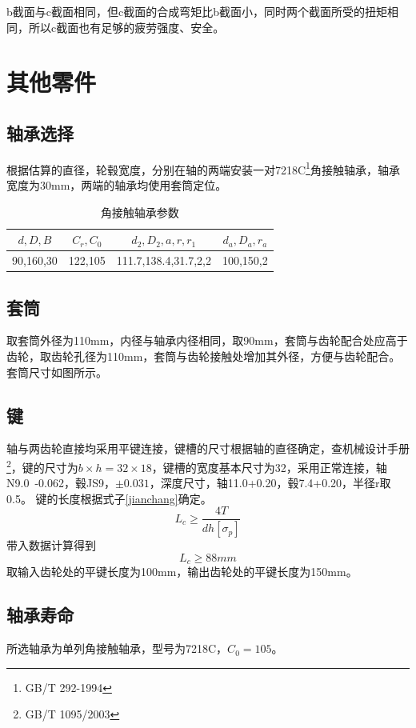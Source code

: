 	b截面与c截面相同，但c截面的合成弯矩比b截面小，同时两个截面所受的扭矩相同，所以c截面也有足够的疲劳强度、安全。

\section{其他零件}

\subsection{轴承选择}\label{zhoucheng}
	根据估算的直径，轮毂宽度，分别在轴的两端安装一对7218C\footnote{GB/T 292-1994}角接触轴承，轴承宽度为30mm，两端的轴承均使用套筒定位。

	\begin{table}[H]
		\centering
		\begin{tabular}{cccc}
			\toprule 
			$d,D,B$ & $C_r,C_0$ & $d_2,D_2,a,r,r_1$ & $d_a,D_a,r_a$\\
			\midrule 
			90,160,30 & 122,105 & 111.7,138.4,31.7,2,2 & 100,150,2\\
			\bottomrule
		\end{tabular}
		\caption{角接触轴承参数}
		\label{tab:arg}
	\end{table}

\subsection{套筒}
	取套筒外径为110mm，内径与轴承内径相同，取90mm，套筒与齿轮配合处应高于齿轮，取齿轮孔径为110mm，套筒与齿轮接触处增加其外径，方便与齿轮配合。套筒尺寸如图所示。

\subsection{键}
	轴与两齿轮直接均采用平键连接，键槽的尺寸根据轴的直径确定，查机械设计手册\footnote{GB/T 1095/2003}，键的尺寸为$b\times h = 32\times 18$，键槽的宽度基本尺寸为32，采用正常连接，轴N9.0~-0.062，毂JS9，$\pm 0.031$，深度尺寸，轴11.0+0.20，毂7.4+0.20，半径r取0.5。
	键的长度根据式子\ref{jianchang}确定。
	\begin{equation}\label{jianchang}
		L_c \geq \frac{4T}{dh[\sigma_p]}
	\end{equation}
	带入数据计算得到
	\[L_c \geq 88mm\]
	取输入齿轮处的平键长度为100mm，输出齿轮处的平键长度为150mm。
\subsection{轴承寿命}
	所选轴承为单列角接触轴承，型号为7218C，$C_0 = 105$。
